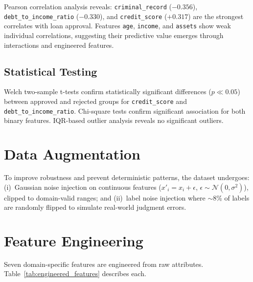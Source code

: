 \documentclass[12pt]{report}
\begin{document}
Pearson correlation analysis reveals: \texttt{criminal\_record} ($-0.356$), \texttt{debt\_to\_income\_ratio} ($-0.330$), and \texttt{credit\_score} ($+0.317$) are the strongest correlates with loan approval. Features \texttt{age}, \texttt{income}, and \texttt{assets} show weak individual correlations, suggesting their predictive value emerges through interactions and engineered features.

\subsection{Statistical Testing}

Welch two-sample t-tests confirm statistically significant differences ($p \ll 0.05$) between approved and rejected groups for \texttt{credit\_score} and \texttt{debt\_to\_income\_ratio}. Chi-square tests confirm significant association for both binary features. IQR-based outlier analysis reveals no significant outliers.


\section{Data Augmentation}

To improve robustness and prevent deterministic patterns, the dataset undergoes: (i)~Gaussian noise injection on continuous features ($x'_i = x_i + \epsilon$, $\epsilon \sim \mathcal{N}(0, \sigma^2)$), clipped to domain-valid ranges; and (ii)~label noise injection where $\sim$8\% of labels are randomly flipped to simulate real-world judgment errors.


\section{Feature Engineering}

Seven domain-specific features are engineered from raw attributes. Table~\ref{tab:engineered_features} describes each.
\end{document}
